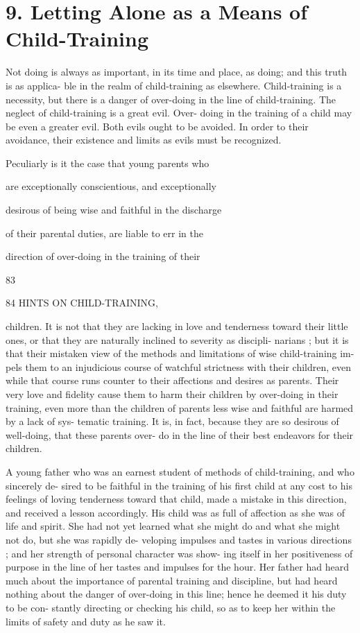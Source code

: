 \documentclass[
]{book}
\begin{document}
\hypertarget{letting-alone-as-a-means-of-child-training}{%
\chapter{9. Letting Alone as a Means of Child-Training}\label{letting-alone-as-a-means-of-child-training}}

Not doing is always as important, in its time and place, as doing; and this truth is as applica- ble in the realm of child-training as elsewhere. Child-training is a necessity, but there is a danger of over-doing in the line of child-training. The neglect of child-training is a great evil. Over- doing in the training of a child may be even a greater evil. Both evils ought to be avoided. In order to their avoidance, their existence and limits as evils must be recognized.

Peculiarly is it the case that young parents who

are exceptionally conscientious, and exceptionally

desirous of being wise and faithful in the discharge

of their parental duties, are liable to err in the

direction of over-doing in the training of their

83

84 HINTS ON CHILD-TRAINING,

children. It is not that they are lacking in love and tenderness toward their little ones, or that they are naturally inclined to severity as discipli- narians ; but it is that their mistaken view of the methods and limitations of wise child-training im- pels them to an injudicious course of watchful strictness with their children, even while that course runs counter to their affections and desires as parents. Their very love and fidelity cause them to harm their children by over-doing in their training, even more than the children of parents less wise and faithful are harmed by a lack of sys- tematic training. It is, in fact, because they are so desirous of well-doing, that these parents over- do in the line of their best endeavors for their children.

A young father who was an earnest student of methods of child-training, and who sincerely de- sired to be faithful in the training of his first child at any cost to his feelings of loving tenderness toward that child, made a mistake in this direction, and received a lesson accordingly. His child was as full of affection as she was of life and spirit. She had not yet learned what she might do and what she might not do, but she was rapidly de- veloping impulses and tastes in various directions ; and her strength of personal character was show- ing itself in her positiveness of purpose in the line of her tastes and impulses for the hour. Her father had heard much about the importance of parental training and discipline, but had heard nothing about the danger of over-doing in this line; hence he deemed it his duty to be con- stantly directing or checking his child, so as to keep her within the limits of safety and duty as he saw it.
\end{document}
